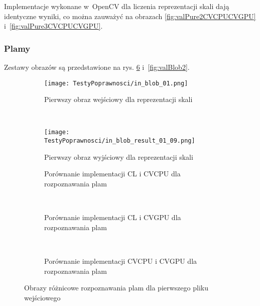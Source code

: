 Implementacje wykonane w~OpenCV dla liczenia reprezentacji skali dają identyczne wyniki, co można zauważyć na obrazach \ref{fig:valPure2CVCPUCVGPU} i~\ref{fig:valPure3CVCPUCVGPU}.

\subsubsection{Plamy}
\label{subsubsec:plamyRysunki}

Zestawy obrazów są przedstawione na rys. \ref{fig:valBlob1} i~\ref{fig:valBlob2}. 

\begin{figure}[h]

\begin{center}
\begin{subfigure}[t]{0.3\textwidth}
\texttt{[image: TestyPoprawnosci/in\_blob\_01.png]}
\caption{Pierwszy obraz wejściowy dla reprezentacji skali}
\label{fig:valBlob01}
\end{subfigure}
~
\begin{subfigure}[t]{0.3\textwidth}
\texttt{[image: TestyPoprawnosci/in\_blob\_result\_01\_09.png]}
\caption{Pierwszy obraz wyjściowy dla reprezentacji skali}
\label{fig:valBlobResult01}
\end{subfigure}
\end{center}


\begin{subfigure}[t]{0.3\textwidth}
	\centering
	\setlength\fboxsep{0pt}
	\setlength\fboxrule{0.5pt}
	\caption{Porównanie implementacji CL i CVCPU dla rozpoznawania plam}
	\label{fig:valBlob2CLCVCPU}
\end{subfigure}
~
\begin{subfigure}[t]{0.3\textwidth}
	\centering
	\setlength\fboxsep{0pt}
	\setlength\fboxrule{0.5pt}
	\caption{Porównanie implementacji CL i CVGPU dla rozpoznawania plam}
	\label{fig:valBlob2CLCVGPU}
\end{subfigure}
~
\begin{subfigure}[t]{0.3\textwidth}
	\centering
	\setlength\fboxsep{0pt}
	\setlength\fboxrule{0.5pt}
	\caption{Porównanie implementacji CVCPU i CVGPU dla rozpoznawania plam}
	\label{fig:valblob2CVCPUCVGPU}                 
\end{subfigure}
\caption{Obrazy różnicowe rozpoznawania plam dla pierwszego pliku wejściowego}

\label{fig:valBlob1}
\end{figure}

